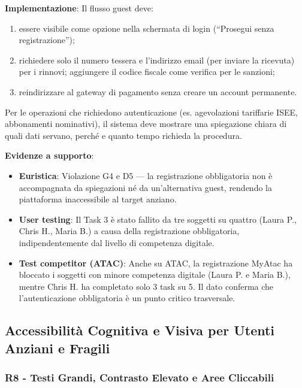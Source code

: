 ﻿\documentclass[11pt,a4paper]{article}
\begin{document}
\textbf{Implementazione}: Il flusso guest deve:
\begin{enumerate}
    \item essere visibile come opzione nella schermata di login
    (``Prosegui senza registrazione'');
    \item richiedere solo il numero tessera e l'indirizzo email (per
    inviare la ricevuta) per i rinnovi; aggiungere il codice fiscale
    come verifica per le sanzioni;
    \item reindirizzare al gateway di pagamento senza creare un account
    permanente.
\end{enumerate}
Per le operazioni che richiedono autenticazione (es. agevolazioni
tariffarie ISEE, abbonamenti nominativi), il sistema deve mostrare
una spiegazione chiara di quali dati servano, perché e quanto tempo
richieda la procedura.

\textbf{Evidenze a supporto}:
\begin{itemize}
    \item \textbf{Euristica}: Violazione G4 e D5 --- la registrazione
    obbligatoria non è accompagnata da spiegazioni né da un'alternativa
    guest, rendendo la piattaforma inaccessibile al target anziano.
    \item \textbf{User testing}: Il Task 3 \`e stato fallito da tre
    soggetti su quattro (Laura P., Chris H., Maria B.) a causa della
    registrazione obbligatoria, indipendentemente dal livello di
    competenza digitale.
    \item \textbf{Test competitor (ATAC)}: Anche su ATAC, la
    registrazione MyAtac ha bloccato i soggetti con minore competenza
    digitale (Laura P. e Maria B.), mentre Chris H. ha completato solo
    3 task su 5. Il dato conferma che l'autenticazione obbligatoria
    \`e un punto critico trasversale.
\end{itemize}




\subsection{Accessibilit\`a Cognitiva e Visiva per Utenti Anziani e Fragili}

\subsubsection{R8 - Testi Grandi, Contrasto Elevato e Aree Cliccabili}
\label{rec:R8}
\end{document}
